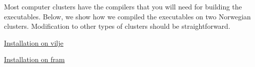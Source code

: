 Most computer clusters have the compilers that you will need for building the executables. Below, we show how we compiled the executables on two Norwegian clusters. Modification to other types of clusters should be straightforward.


\begin{DoxyItemize}
\item \hyperlink{installation-vilje}{Installation on vilje}
\item \hyperlink{installation-fram}{Installation on fram} 
\end{DoxyItemize}